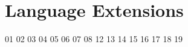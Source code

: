 \section{Language Extensions}
{01}
{02}
{03}
{04}
{05}
{06}
{07}
{08}
{12}
{13}
{14}
{15}
{16}
{17}
{18}
{19}
